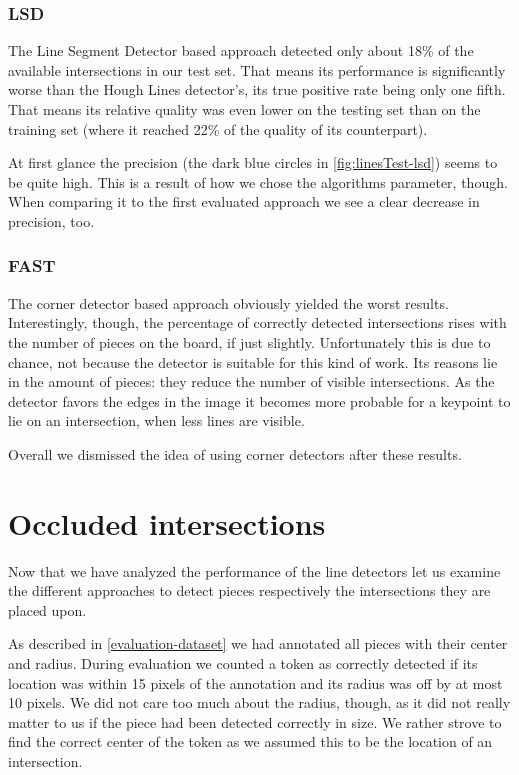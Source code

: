 	\subsubsection{LSD}
	\label{evaluation-visible-performance-lsd}
	The Line Segment Detector based approach detected only about 18\% of the available intersections in our test set. That means its performance is significantly worse than the Hough Lines detector's, its true positive rate being only one fifth. That means its relative quality was even lower on the testing set than on the training set (where it reached 22\% of the quality of its counterpart).

	At first glance the precision (the dark blue circles in \autoref{fig:linesTest-lsd}) seems to be quite high. This is a result of how we chose the algorithms parameter, though. When comparing it to the first evaluated approach we see a clear decrease in precision, too.

	\subsubsection{FAST}
	\label{evaluation-visible-performance-fast}
	The corner detector based approach obviously yielded the worst results. Interestingly, though, the percentage of correctly detected intersections rises with the number of pieces on the board, if just slightly. Unfortunately this is due to chance, not because the detector is suitable for this kind of work. Its reasons lie in the amount of pieces: they reduce the number of visible intersections. As the detector favors the edges in the image it becomes more probable for a keypoint to lie on an intersection, when less lines are visible.

	Overall we dismissed the idea of using corner detectors after these results.
	





	\section{Occluded intersections}
	\label{evaluation-occluded}
	Now that we have analyzed the performance of the line detectors let us examine the different approaches to detect pieces respectively the intersections they are placed upon.

	As described in \autoref{evaluation-dataset} we had annotated all pieces with their center and radius. During evaluation we counted a token as correctly detected if its location was within 15 pixels of the annotation and its radius was off by at most 10 pixels. We did not care too much about the radius, though, as it did not really matter to us if the piece had been detected correctly in size. We rather strove to find the correct center of the token as we assumed this to be the location of an intersection.

